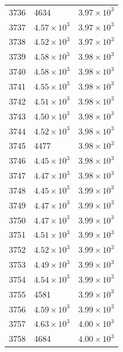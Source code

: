 \begin{table}[H]
\begin{tabular}{lll}
3736 & 4634 & $\displaystyle 3.97 \times 10^{3}$ \\
3737 & $\displaystyle 4.57 \times 10^{3}$ & $\displaystyle 3.97 \times 10^{3}$ \\
3738 & $\displaystyle 4.52 \times 10^{3}$ & $\displaystyle 3.97 \times 10^{3}$ \\
3739 & $\displaystyle 4.58 \times 10^{3}$ & $\displaystyle 3.98 \times 10^{3}$ \\
3740 & $\displaystyle 4.58 \times 10^{3}$ & $\displaystyle 3.98 \times 10^{3}$ \\
3741 & $\displaystyle 4.55 \times 10^{3}$ & $\displaystyle 3.98 \times 10^{3}$ \\
3742 & $\displaystyle 4.51 \times 10^{3}$ & $\displaystyle 3.98 \times 10^{3}$ \\
3743 & $\displaystyle 4.50 \times 10^{3}$ & $\displaystyle 3.98 \times 10^{3}$ \\
3744 & $\displaystyle 4.52 \times 10^{3}$ & $\displaystyle 3.98 \times 10^{3}$ \\
3745 & 4477 & $\displaystyle 3.98 \times 10^{3}$ \\
3746 & $\displaystyle 4.45 \times 10^{3}$ & $\displaystyle 3.98 \times 10^{3}$ \\
3747 & $\displaystyle 4.47 \times 10^{3}$ & $\displaystyle 3.98 \times 10^{3}$ \\
3748 & $\displaystyle 4.45 \times 10^{3}$ & $\displaystyle 3.99 \times 10^{3}$ \\
3749 & $\displaystyle 4.47 \times 10^{3}$ & $\displaystyle 3.99 \times 10^{3}$ \\
3750 & $\displaystyle 4.47 \times 10^{3}$ & $\displaystyle 3.99 \times 10^{3}$ \\
3751 & $\displaystyle 4.51 \times 10^{3}$ & $\displaystyle 3.99 \times 10^{3}$ \\
3752 & $\displaystyle 4.52 \times 10^{3}$ & $\displaystyle 3.99 \times 10^{3}$ \\
3753 & $\displaystyle 4.49 \times 10^{3}$ & $\displaystyle 3.99 \times 10^{3}$ \\
3754 & $\displaystyle 4.54 \times 10^{3}$ & $\displaystyle 3.99 \times 10^{3}$ \\
3755 & 4581 & $\displaystyle 3.99 \times 10^{3}$ \\
3756 & $\displaystyle 4.59 \times 10^{3}$ & $\displaystyle 3.99 \times 10^{3}$ \\
3757 & $\displaystyle 4.63 \times 10^{3}$ & $\displaystyle 4.00 \times 10^{3}$ \\
3758 & 4684 & $\displaystyle 4.00 \times 10^{3}$ \\

\end{tabular}
\end{table}
